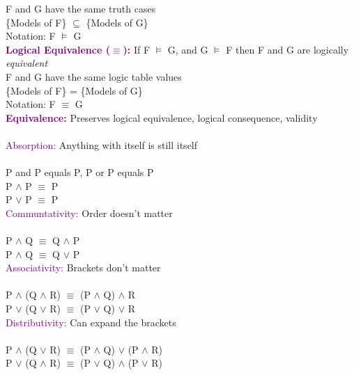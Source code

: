 \documentclass[a4paper,10pt]{article}
\begin{document}
\indent F and G have the same truth cases \\
\indent \{Models of F\} $\subseteq$ \{Models of G\} \\
\indent Notation: F $\models$ G \\

\noindent \textcolor{Purple}{\textbf{Logical Equivalence ($\equiv$):}} If F $\models$ G, and G $\models$ F then F and G are logically \emph{equivalent}\\

\indent F and G have the same logic table values \\
\indent \{Models of F\} = \{Models of G\} \\
\indent Notation: F $\equiv$ G \\ 

\noindent \textcolor{Purple}{\textbf{Equivalence:}} Preserves logical equivalence, logical consequence, validity \\ \\
\indent \textcolor{Purple}{Absorption:}  Anything with itself is still itself\\ \\
\indent P and P equals P, P or P equals P \\
\indent \indent P $\land$ P $\equiv$ P \\
\indent \indent P $\lor$ P $\equiv$ P \\

\indent \textcolor{Purple}{Communtativity:} Order doesn't matter\\ \\
\indent \indent P $\land$ Q $\equiv$ Q $\land$ P \\
\indent \indent P $\land$ Q $\equiv$ Q $\lor$ P \\

\indent \textcolor{Purple}{Associativity:} Brackets don't matter \\ \\
\indent \indent P $\land$ (Q $\land$ R) $\equiv$ (P $\land$ Q) $\land$ R \\
\indent \indent P $\lor$ (Q $\lor$ R) $\equiv$ (P $\lor$ Q) $\lor$ R \\

\indent \textcolor{Purple}{Distributivity:} Can expand the brackets \\ \\
\indent \indent P $\land$ (Q $\lor$ R) $\equiv$ (P $\land$ Q) $\lor$ (P $\land$ R) \\
\indent \indent P $\lor$ (Q $\land$ R) $\equiv$ (P $\lor$ Q) $\land$ (P $\lor$ R) \\
\end{document}
